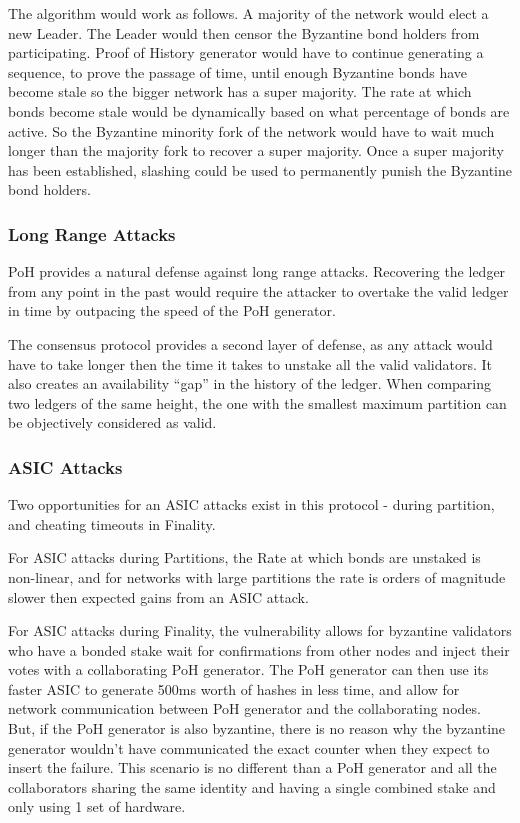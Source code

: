 \documentclass[12pt]{article}
\begin{document}
The algorithm would work as follows. A majority of the network would elect a new Leader. The Leader would then censor the Byzantine bond holders from participating. Proof of History generator would have to continue generating a sequence, to prove the passage of time, until enough Byzantine bonds have become stale so the bigger network has a super majority. The rate at which bonds become stale would be dynamically based on what percentage of bonds are active. So the Byzantine minority fork of the network would have to wait much longer than the majority fork to recover a super majority. Once a super majority has been established, slashing could be used to permanently punish the Byzantine bond holders.

\subsubsection{Long Range Attacks}\label{censorship}
PoH provides a natural defense against long range attacks. Recovering the ledger from any point in the past would require the attacker to overtake the valid ledger in time by outpacing the speed of the PoH generator.

The consensus protocol provides a second layer of defense, as any attack would have to take longer then the time it takes to unstake all the valid validators. It also creates an availability “gap” in the history of the ledger. When comparing two ledgers of the same height, the one with the smallest maximum partition can be objectively considered as valid.

\subsubsection{ASIC Attacks}\label{censorship}

Two opportunities for an ASIC attacks exist in this protocol - during partition, and cheating timeouts in Finality.

For ASIC attacks during Partitions, the Rate at which bonds are unstaked is non-linear, and for networks with large partitions the rate is orders of magnitude slower then expected gains from an ASIC attack.

For ASIC attacks during Finality, the vulnerability allows for byzantine validators who have a bonded stake wait for confirmations from other nodes and inject their votes with a collaborating PoH generator. The PoH generator can then use its faster ASIC to generate 500ms worth of hashes in less time, and allow for network communication between PoH generator and the collaborating nodes. But, if the PoH generator is also byzantine, there is no reason why the byzantine generator wouldn’t have communicated the exact counter when they expect to insert the failure. This scenario is no different than a PoH generator and all the collaborators sharing the same identity and having a single combined stake and only using 1 set of hardware.
\end{document}
